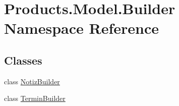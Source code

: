 \hypertarget{namespace_products_1_1_model_1_1_builder}{}\section{Products.\+Model.\+Builder Namespace Reference}
\label{namespace_products_1_1_model_1_1_builder}
\subsection*{Classes}
\begin{DoxyCompactItemize}
\item 
class \hyperlink{class_products_1_1_model_1_1_builder_1_1_notiz_builder}{Notiz\+Builder}
\item 
class \hyperlink{class_products_1_1_model_1_1_builder_1_1_termin_builder}{Termin\+Builder}
\end{DoxyCompactItemize}
